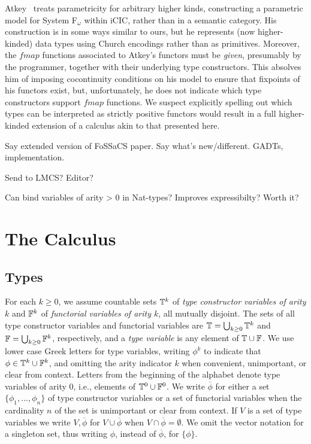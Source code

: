 \documentclass{lmcs}
\theoremstyle{plain}\newtheorem{satz}[thm]{Satz}
\begin{document}
Atkey~\cite{atk12} treats parametricity for arbitrary higher kinds,
constructing a parametric model for System F$_\omega$ within iCIC,
rather than in a semantic category. His construction is in some ways
similar to ours, but he represents (now higher-kinded) data types
using Church encodings rather than as primitives. Moreover, the
$\mathit{fmap}$ functions associated to Atkey's functors must be {\em
  given}, presumably by the programmer, together with their underlying
type constructors. This absolves him of imposing cocontinuity
conditions on his model to ensure that fixpoints of his functors
exist, but, unfortunately, he does not indicate which type
constructors support $\mathit{fmap}$ functions. We suspect explicitly
spelling out which types can be interpreted as strictly positive
functors would result in a full higher-kinded extension of a calculus
akin to that presented here.

{\color{red} Say extended version of FoSSaCS paper. Say what's
  new/different. GADTs, implementation.

  Send to LMCS? Editor?

Can bind variables of arity > 0 in Nat-types? Improves expressibilty?
Worth it?}   

\section{The Calculus}\label{sec:calculus}

\subsection{Types}
For each $k \ge 0$, we assume countable sets $\mathbb{T}^k$ of \emph{type
  constructor variables of arity $k$} and $\mathbb{F}^k$ of
\emph{functorial variables of arity $k$}, all mutually disjoint.  The
sets of all type constructor variables and functorial variables are
$\mathbb{T} = \bigcup_{k \ge 0} \mathbb{T}^k$ and $\mathbb{F} = \bigcup_{k \ge 0}
\mathbb{F}^k$, respectively, and a \emph{type variable} is any element of
$\mathbb{T} \cup \mathbb{F}$.  We use lower case Greek letters for type
variables, writing $\phi^k$ to indicate that $\phi \in \mathbb{T}^k \cup
\mathbb{F}^k$, and omitting the arity indicator $k$ when convenient,
unimportant, or clear from context. Letters from the beginning of the
alphabet denote type variables of arity $0$, i.e., elements of
$\mathbb{T}^0 \cup \mathbb{F}^0$. We write $\overline{\phi}$ for either a set
$\{\phi_1,...,\phi_n\}$ of type constructor variables or a set of
functorial variables when the cardinality $n$ of the set is
unimportant or clear from context. If $V$ is a set of type variables
we write $V, \overline{\phi}$ for $V \cup \overline{\phi}$ when $V
\cap \overline{\phi} = \emptyset$.  We omit the vector notation for a
singleton set, thus writing $\phi$, instead of $\overline{\phi}$, for
$\{\phi\}$.
\end{document}
